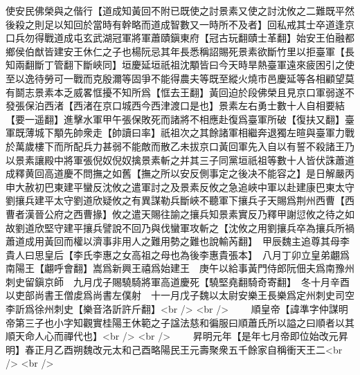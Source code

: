 使安民佛榮與之偕行【道成知黃回不附已既使之討景素又使之討沈攸之二難既平然後殺之則足以知回於當時有幹略而道成智數又一時所不及者】回私戒其士卒道逢京口兵勿得戰道成屯玄武湖冠軍將軍蕭賾鎭東府【冠古玩翻賾士革翻】始安王伯融都鄉侯伯猷皆建安王休仁之子也楊阮忌其年長悉稱詔賜死景素欲斷竹里以拒臺軍【長知兩翻斷丁管翻下斷峽同】垣慶延垣祇祖沈顒皆曰今天時旱熱臺軍遠來疲困引之使至以逸待勞可一戰而克殷濔等固爭不能得農夫等既至縱火燒市邑慶延等各相顧望莫有鬬志景素本乏威畧恇擾不知所爲【恇去王翻】黃回迫於段佛榮且見京口軍弱遂不發張保泊西渚【西渚在京口城西今西津渡口是也】景素左右勇士數十人自相要結【要一遥翻】進擊水軍甲午張保敗死而諸將不相應赴復爲臺軍所破【復扶又翻】臺軍既薄城下顒先帥衆走【帥讀曰率】祇祖次之其餘諸軍相繼奔退獨左暄與臺軍力戰於萬歲樓下而所配兵力甚弱不能敵而散乙未拔京口黃回軍先入自以有誓不殺諸王乃以景素讓殿中將軍張倪奴倪奴擒景素斬之并其三子同黨垣祇祖等數十人皆伏誅蕭道成釋黄回高道慶不問撫之如舊【撫之所以安反側事定之後决不能容之】是日解嚴丙申大赦初巴東建平蠻反沈攸之遣軍討之及景素反攸之急追峽中軍以赴建康巴東太守劉攘兵建平太守劉道欣疑攸之有異謀勒兵斷峽不聽軍下攘兵子天賜爲荆州西曹【西曹者漢晉公府之西曹掾】攸之遣天賜往諭之攘兵知景素實反乃釋甲謝愆攸之待之如故劉道欣堅守建平攘兵譬說不回乃與伐蠻軍攻斬之【沈攸之用劉攘兵卒為攘兵所禍蕭道成用黃回而權以濟事非用人之難用勢之難也說輸芮翻】　甲辰魏主追尊其母李貴人曰思皇后【李氏李惠之女高祖之母也為後李惠貴張本】　八月丁卯立皇弟翽爲南陽王【翽呼會翻】嵩爲新興王禧爲始建王　庚午以給事黃門侍郎阮佃夫爲南豫州刺史留鎭京師　九月戊子賜驍騎將軍高道慶死【驍堅堯翻騎奇寄翻】　冬十月辛酉以吏部尚書王僧䖍爲尚書左僕射　十一月戊子魏以太尉安樂王長樂爲定州刺史司空李訢爲徐州刺史【樂音洛訢許斤翻】<br />
<br />
　　順皇帝【諱準字仲謀明帝第三子也小字知觀實桂陽王休範之子諡法慈和徧服曰順蕭氏所以謚之曰順者以其順天命人心而禪代也】<br />
<br />
　　昇明元年【是年七月帝即位始改元昇明】春正月乙酉朔魏改元太和己酉略陽民王元壽聚衆五千餘家自稱衝天王二<br />
<br />

